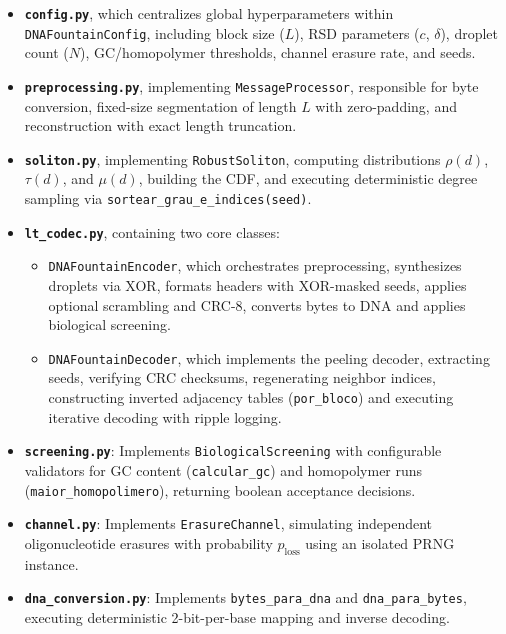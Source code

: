 \begin{itemize}
    \item \textbf{\texttt{config.py}}, which centralizes global hyperparameters within \texttt{DNAFountainConfig}, including block size ($L$), RSD parameters ($c$, $\delta$), droplet count ($N$), GC/homopolymer thresholds, channel erasure rate, and seeds.

    \item \textbf{\texttt{preprocessing.py}}, implementing \texttt{MessageProcessor}, responsible for byte conversion, fixed-size segmentation of length $L$ with zero-padding, and reconstruction with exact length truncation.

    \item \textbf{\texttt{soliton.py}}, implementing \texttt{RobustSoliton}, computing distributions $\rho(d)$, $\tau(d)$, and $\mu(d)$, building the CDF, and executing deterministic degree sampling via \texttt{sortear\_grau\_e\_indices(seed)}.

    \item \textbf{\texttt{lt\_codec.py}}, containing two core classes:
    \begin{itemize}
        \item \texttt{DNAFountainEncoder}, which orchestrates preprocessing, synthesizes droplets via XOR, formats headers with XOR-masked seeds, applies optional scrambling and CRC-8, converts bytes to DNA and applies biological screening.
        \item \texttt{DNAFountainDecoder}, which implements the peeling decoder, extracting seeds, verifying CRC checksums, regenerating neighbor indices, constructing inverted adjacency tables (\texttt{por\_bloco}) and executing iterative decoding with ripple logging.
    \end{itemize}

    \item \textbf{\texttt{screening.py}}: Implements \texttt{BiologicalScreening} with configurable validators for GC content (\texttt{calcular\_gc}) and homopolymer runs (\texttt{maior\_homopolimero}), returning boolean acceptance decisions.

    \item \textbf{\texttt{channel.py}}: Implements \texttt{ErasureChannel}, simulating independent oligonucleotide erasures with probability $p_{\text{loss}}$ using an isolated PRNG instance.

    \item \textbf{\texttt{dna\_conversion.py}}: Implements \texttt{bytes\_para\_dna} and \texttt{dna\_para\_bytes}, executing deterministic 2-bit-per-base mapping and inverse decoding.


\end{itemize}
